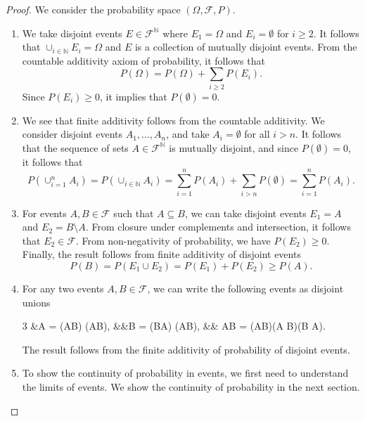 \documentclass[letterpaper,10pt,english]{article}
\theoremstyle{plain}
\theoremstyle{definition}
\theoremstyle{remark}
\newcommand{\EQ}[1]{\begin{equation*}#1\end{equation*}}
\newcommand{\meq}[2]{\begin{xalignat*}{#1}#2\end{xalignat*}}
\newcommand{\N}{\mathbb{N}}
\newcommand{\sF}{\mathscr{F}}
\renewcommand{\ge}{\geqslant}
\begin{document}
\begin{proof}
We consider the probability space $(\Omega, \sF, P)$.
\begin{enumerate}
\item We take disjoint events $E\in\sF^\N$ where $E_1 = \Omega$ and $E_i = \emptyset$ for $i \ge 2$. 
It follows that $\cup_{i \in \N}E_i = \Omega$ and $E$ is a collection of mutually disjoint events.  
From the countable additivity axiom of probability, it follows that
\EQ{
P(\Omega) = P(\Omega) + \sum_{i \ge 2}P(E_i). 
}
Since $P(E_i) \ge 0$, it implies that $P(\emptyset) = 0$. 
\item 
We see that finite additivity follows from the countable additivity. 
We consider disjoint events $A_1, \dots, A_n$, and take $A_{i} = \emptyset$ for all $i > n$. 
It follows that the sequence of sets $A\in\sF^\N$ is mutually disjoint, and since $P(\emptyset) = 0$, it follows that  
\EQ{
P(\cup_{i=1}^nA_i) = P(\cup_{i \in \N}A_i) = \sum_{i=1}^nP(A_i) + \sum_{i > n}P(\emptyset) =  \sum_{i=1}^nP(A_i).
}
\item For events $A, B \in \sF$ such that $A \subseteq B$, we can take disjoint events $E_1 = A$ and $E_2 = B\setminus A$. 
From closure under complements and intersection, it follows that $E_2 \in \sF$. 
From non-negativity of probability, we have $P(E_2) \ge 0$. 
Finally, the result follows from finite additivity of disjoint events 
\EQ{
P(B) = P(E_1 \cup E_2)= P(E_1) + P(E_2) \ge P(A).
}
\item For any two events $A, B \in \sF$, we can write the following events as disjoint unions  
\meq{3}{
&A = (A\setminus B) \cup (A\cap B), &&B = (B\setminus A) \cup (A\cap B), && A\cup B = (A\setminus B)\cup(A \cap B)\cup(B \setminus A).
}
The result follows from the finite additivity of probability of disjoint events. 

\item To show the continuity of probability in events, we first need to understand the limits of events. 
We show the continuity of probability in the next section. 
\end{enumerate}
\end{proof}
\end{document}
